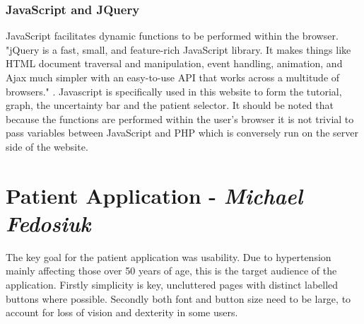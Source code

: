 \documentclass[11pt]{article}
\begin{document}
\subsubsection{JavaScript and JQuery}
JavaScript facilitates dynamic functions to be performed within the browser. "jQuery is a fast, small, and feature-rich JavaScript library. It makes things like HTML document traversal and manipulation, event handling, animation, and Ajax much simpler with an easy-to-use API that works across a multitude of browsers." \cite{Jquery}. Javascript is specifically used in this website to form the tutorial, graph, the uncertainty bar and the patient selector. It should be noted that because the functions are performed within the user's browser it is not trivial to pass variables between JavaScript and PHP which is conversely run on the server side of the website. 


\section{Patient Application - \textit{Michael Fedosiuk}}

The key goal for the patient application was usability. Due to hypertension mainly affecting those over 50 years of age, this is the target audience of the application. Firstly simplicity is key, uncluttered pages with distinct labelled buttons where possible. Secondly both font and button size need to be large, to account for loss of vision and dexterity in some users. 
\end{document}
